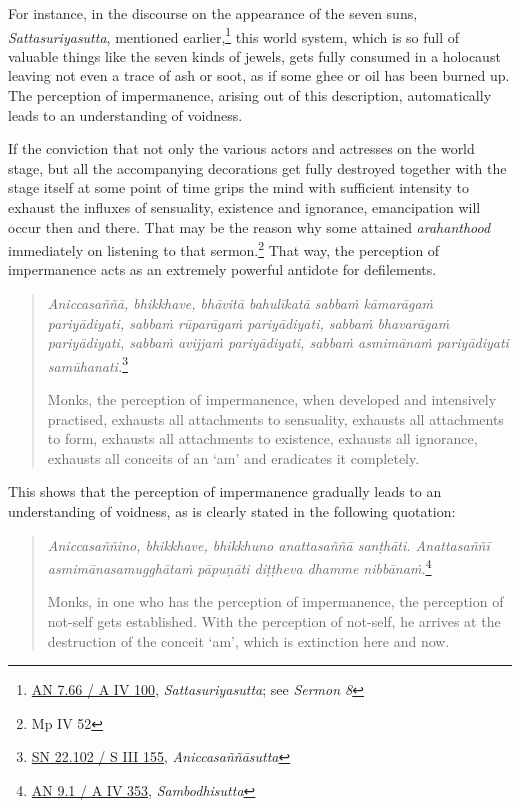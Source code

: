 For instance, in the discourse on the appearance of the seven suns, \emph{Sattasuriyasutta}, mentioned earlier,\footnote{\href{https://suttacentral.net/an7.66/pli/ms}{AN 7.66 / A IV 100}, \emph{Sattasuriyasutta}; see \emph{Sermon 8}} this world system, which is so full of valuable things like the seven kinds of jewels, gets fully consumed in a holocaust leaving not even a trace of ash or soot, as if some ghee or oil has been burned up. The perception of impermanence, arising out of this description, automatically leads to an understanding of voidness.

If the conviction that not only the various actors and actresses on the world stage, but all the accompanying decorations get fully destroyed together with the stage itself at some point of time grips the mind with sufficient intensity to exhaust the influxes of sensuality, existence and ignorance, emancipation will occur then and there. That may be the reason why some attained \emph{arahanthood} immediately on listening to that sermon.\footnote{Mp IV 52} That way, the perception of impermanence acts as an extremely powerful antidote for defilements.

\begin{quote}
\emph{Aniccasaññā, bhikkhave, bhāvitā bahulīkatā sabbaṁ kāmarāgaṁ pariyādiyati, sabbaṁ rūparāgaṁ pariyādiyati, sabbaṁ bhavarāgaṁ pariyādiyati, sabbaṁ avijjaṁ pariyādiyati, sabbaṁ asmimānaṁ pariyādiyati samūhanati.}\footnote{\href{https://suttacentral.net/sn22.102/pli/ms}{SN 22.102 / S III 155}, \emph{Aniccasaññāsutta}}

Monks, the perception of impermanence, when developed and intensively practised, exhausts all attachments to sensuality, exhausts all attachments to form, exhausts all attachments to existence, exhausts all ignorance, exhausts all conceits of an `am' and eradicates it completely.
\end{quote}

This shows that the perception of impermanence gradually leads to an understanding of voidness, as is clearly stated in the following quotation:

\begin{quote}
\emph{Aniccasaññino, bhikkhave, bhikkhuno anattasaññā sanṭhāti. Anattasaññī asmimānasamugghātaṁ pāpuṇāti diṭṭheva dhamme nibbānaṁ.}\footnote{\href{https://suttacentral.net/an9.1/pli/ms}{AN 9.1 / A IV 353}, \emph{Sambodhisutta}}

Monks, in one who has the perception of impermanence, the perception of not-self gets established. With the perception of not-self, he arrives at the destruction of the conceit `am', which is extinction here and now.
\end{quote}

